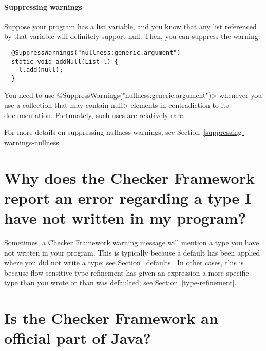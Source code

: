 




\paragraph{Suppressing warnings}

Suppose your program has a list variable, and you know that any list referenced
by that variable will definitely support null.  Then, you can suppress the
warning:

\begin{Verbatim}
  @SuppressWarnings("nullness:generic.argument")
  static void addNull(List l) {
    l.add(null);
  }
\end{Verbatim}

\noindent
You need to use \<@SuppressWarnings("nullness:generic.argument")>
whenever you use a collection that may contain \<null> elements in
contradiction to its documentation.  Fortunately, such uses are relatively
rare.


For more details on suppressing nullness warnings, see
Section~\ref{suppressing-warnings-nullness}.


\section{Why does the Checker Framework report an error regarding a type I have not written in my program?\label{faq-type-i-did-not-write}}


Sometimes, a Checker Framework warning message will mention a type you have
not written in your program.  This is typically because a default has been
applied where you did not write a type; see Section~\ref{defaults}.  In
other cases, this is because flow-sensitive type refinement has given an
expression a more specific type than you wrote or than was defaulted; see
Section~\ref{type-refinement}.


\section{Is the Checker Framework an official part of Java?\label{faq-checker-framework-part-of-java}}

